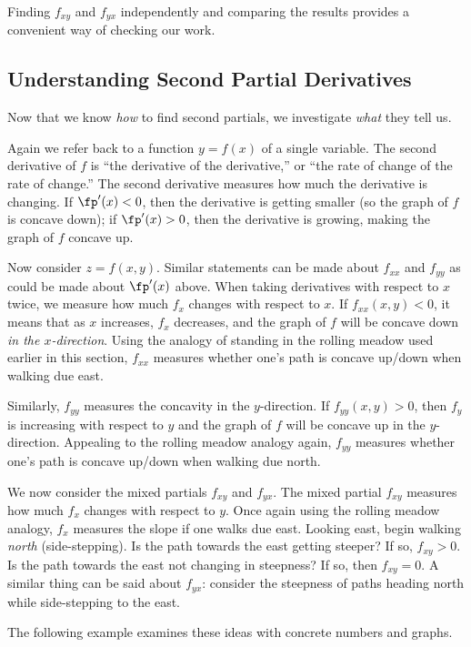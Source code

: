 Finding $f_{xy}$ and $f_{yx}$ independently and comparing the results provides a convenient way of checking our work.

\subsection{Understanding Second Partial Derivatives}

Now that we know \emph{how} to find second partials, we investigate \emph{what} they tell us. 

Again we refer back to a function $y=f(x)$ of a single variable. The second derivative of $f$ is ``the derivative of the derivative,'' or ``the rate of change of the rate of change.'' The second derivative measures how much the derivative is changing. If $\fp'(x)<0$, then the derivative is getting smaller (so the graph of $f$ is concave down); if $\fp'(x)>0$, then the derivative is growing, making the graph of $f$ concave up. 

Now consider $z=f(x,y)$. Similar statements can be made about $f_{xx}$ and $f_{yy}$ as could be made about $\fp'(x)$ above. When taking derivatives with respect to $x$ twice, we measure how much $f_x$ changes with respect to $x$. If $f_{xx}(x,y)<0$, it means that as $x$ increases, $f_x$ decreases, and the graph of $f$ will be concave down \emph{in the $x$-direction}. Using the analogy of standing in the rolling meadow used earlier in this section, $f_{xx}$ measures whether one's path is concave up/down when walking due east.

Similarly, $f_{yy}$ measures the concavity in the $y$-direction. If $f_{yy}(x,y)>0$, then $f_y$ is increasing with respect to $y$ and the graph of $f$ will be concave up in the $y$-direction. Appealing to the rolling meadow analogy again, $f_{yy}$ measures whether one's path is concave up/down when walking due north.

We now consider the mixed partials $f_{xy}$ and $f_{yx}$. The mixed partial $f_{xy}$ measures how much $f_x$ changes with respect to $y$. Once again using the rolling meadow analogy, $f_{x}$ measures the slope if one walks due east. Looking east, begin walking \emph{north} (side-stepping). Is the path towards the east getting steeper? If so, $f_{xy}>0$. Is the path towards the east not changing in steepness? If so, then $f_{xy}=0$. A similar thing can be said about $f_{yx}$: consider the steepness of paths heading north while side-stepping to the east.

The following example examines these ideas with concrete numbers and graphs.

